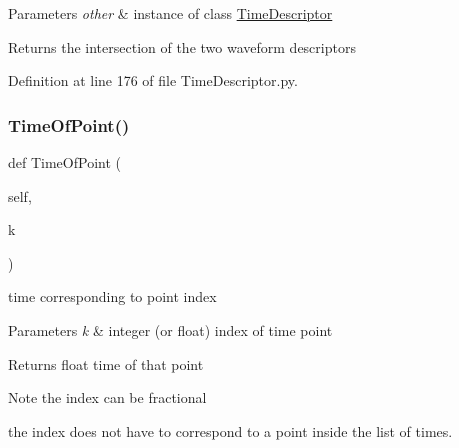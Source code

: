 \begin{DoxyParams}{Parameters}
{\em other} & instance of class \hyperlink{classSignalIntegrity_1_1TimeDomain_1_1Waveform_1_1TimeDescriptor_1_1TimeDescriptor}{Time\+Descriptor} \\
\hline
\end{DoxyParams}
\begin{DoxyReturn}{Returns}
the intersection of the two waveform descriptors 
\end{DoxyReturn}


Definition at line 176 of file Time\+Descriptor.\+py.

\mbox{\label{classSignalIntegrity_1_1TimeDomain_1_1Waveform_1_1TimeDescriptor_1_1TimeDescriptor_a424294098a65aea372b401299964e433}} 
\subsubsection{\texorpdfstring{Time\+Of\+Point()}{TimeOfPoint()}}
{\footnotesize\ttfamily def Time\+Of\+Point (\begin{DoxyParamCaption}\item[{}]{self,  }\item[{}]{k }\end{DoxyParamCaption})}



time corresponding to point index 


\begin{DoxyParams}{Parameters}
{\em k} & integer (or float) index of time point \\
\hline
\end{DoxyParams}
\begin{DoxyReturn}{Returns}
float time of that point 
\end{DoxyReturn}
\begin{DoxyNote}{Note}
the index can be fractional 

the index does not have to correspond to a point inside the list of times. 
\end{DoxyNote}


